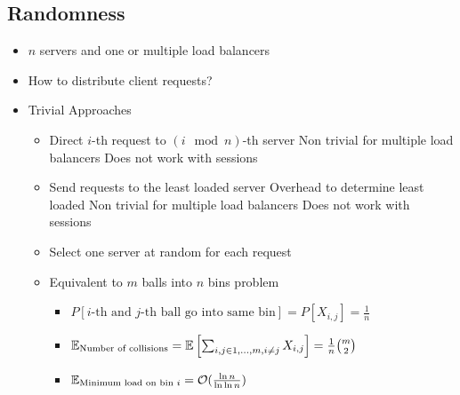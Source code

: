 \subsection{Randomness}
\begin{itemize}
        \begin{itemize}
            \item $n$ servers and one or multiple load balancers
            \item How to distribute client requests?
            \item Trivial Approaches
                \begin{itemize}
                        \begin{itemize}
                            \item Direct $i$-th request to $(i \mod n)$-th server
                            \icon Non trivial for multiple load balancers
                            \icon Does not work with sessions
                        \end{itemize}
                        \begin{itemize}
                            \item Send requests to the least loaded server
                            \icon Overhead to determine least loaded
                            \icon Non trivial for multiple load balancers
                            \icon Does not work with sessions
                        \end{itemize}
                 \end{itemize}
                \begin{itemize}
                    \item Select one server at random for each request
                    \item Equivalent to $m$ balls into $n$ bins problem
                        \begin{itemize}
                            \item $P[i \text{-th and } j \text{-th ball go into same bin}] = P[X_{i,j}] =  \frac{1}{n}$
                            \item $\mathbb{E}_{\text{Number of collisions}} = \mathbb{E} \left[ \sum_{i,j \in 1, \dots, m, i \neq j} X_{i,j} \right] = \frac{1}{n} {m\choose 2}$
                            \item $\mathbb{E}_{\text{Minimum load on bin } i} = \mathcal{O}(\frac{\ln n}{\ln \ln n})$

\end{itemize}
\end{itemize}
\end{itemize}
\end{itemize}
